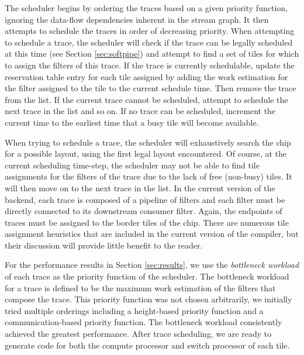 The scheduler begins by ordering the traces based on a given priority
function, ignoring the data-flow dependencies inherent in the stream
graph.  It then attempts to schedule the traces in order of decreasing
priority.  When attempting to schedule a trace, the scheduler will
check if the trace can be legally scheduled at this time (see Section
\ref{sec:softpipe}) and attempt to find a set of tiles for which to
assign the filters of this trace. If the trace is currently
schedulable, update the reservation table entry for each tile assigned
by adding the work estimation for the filter assigned to the tile to
the current schedule time. Then remove the trace from the list.
If the current trace cannot be scheduled, attempt to schedule the next
trace in the list and so on.  If no trace can be scheduled, increment the
current time to the earliest time that a busy tile will become
available.

When trying to schedule a trace, the scheduler will exhaustively
search the chip for a possible layout, using the first legal layout
encountered. Of course, at the current scheduling time-step, the
scheduler may not be able to find tile assignments for the filters of
the trace due to the lack of free (non-busy) tiles.  It will then move
on to the next trace in the list. In the current version of the
backend, each trace is composed of a pipeline of filters and each
filter must be directly connected to its downstream consumer filter.
Again, the endpoints of traces must be assigned to the border tiles of
the chip.  There are numerous tile assignment heuristics that are
included in the current version of the compiler, but their discussion
will provide little benefit to the reader.

For the performance results in Section \ref{sec:results}, we use the
{\it bottleneck workload} of each trace as the priority function of
the scheduler. The bottleneck workload for a trace is defined to be
the maximum work estimation of the filters that compose the trace.
This priority function was not chosen arbitrarily, we initially tried
multiple orderings including a height-based priority function and a
communication-based priority function.
The bottleneck workload consistently achieved the greatest
performance. After trace scheduling, we are ready to generate code for
both the compute processor and switch processor of each tile.
